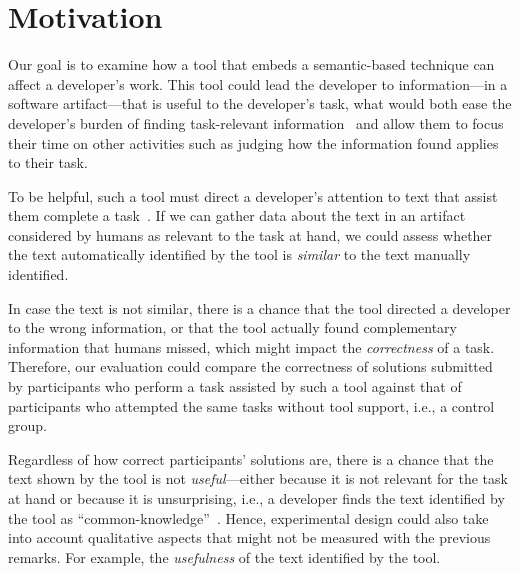 


\section{Motivation}
\label{cp6:method}



Our goal is to examine how a tool that embeds a semantic-based technique can affect a developer's work.
This tool could lead the developer to information---in a software artifact---that is useful to the developer's task,
what would both ease the developer's burden of finding task-relevant information~\cite{Robillard2015}
and allow them to focus their time on other activities such as judging how the information found applies to their task.





To be helpful, such a tool must direct a developer's attention to text that assist them complete a task~\cite{Robillard2015}.
If we can gather data about the text in an artifact considered by humans as relevant to the task at hand, 
we could assess whether the text automatically identified by the tool is \textit{similar} to the text manually identified. 


In case the text is not similar,
there is a chance that the tool directed a developer to the wrong information, or that 
the tool actually found complementary information that humans missed, which might impact the \textit{correctness} of a task. 
Therefore, our evaluation could compare the correctness of solutions submitted by participants who perform a task assisted by such a
tool against that of participants who attempted the same tasks without tool support, i.e., a control group.


Regardless of how correct participants' solutions are, there is a chance that the text shown by the tool is not \textit{useful}---either because it is not relevant for the task at hand or because it is unsurprising, i.e., 
a developer finds the text identified by the tool as ``common-knowledge''~\cite{cwalina2008, Robillard2015}. Hence, experimental design could also take into account qualitative aspects 
that might not be measured with the previous remarks. For example, the \textit{usefulness} of the text identified by the tool. 




